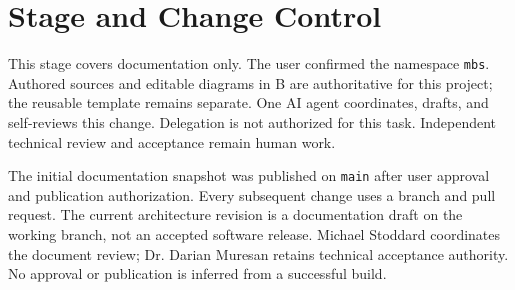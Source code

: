 \section{Stage and Change Control}
This stage covers documentation only. The user confirmed the namespace \texttt{mbs}. Authored sources and editable diagrams in B are authoritative for this project; the reusable template remains separate. One AI agent coordinates, drafts, and self-reviews this change. Delegation is not authorized for this task. Independent technical review and acceptance remain human work.

The initial documentation snapshot was published on \texttt{main} after user approval and publication authorization. Every subsequent change uses a branch and pull request. The current architecture revision is a documentation draft on the working branch, not an accepted software release. Michael Stoddard coordinates the document review; Dr. Darian Muresan retains technical acceptance authority. No approval or publication is inferred from a successful build.

